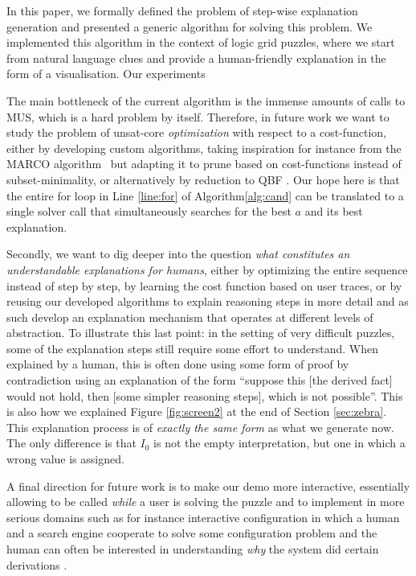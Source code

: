 In this paper, we formally defined the problem of step-wise explanation generation and presented a generic algorithm for solving this problem. 
We implemented this algorithm in the context of logic grid puzzles, where we start from natural language clues and provide a human-friendly explanation in the form of a visualisation.
Our experiments 


The main bottleneck of the current algorithm is the immense amounts of calls to MUS, which is a hard problem by itself. 
Therefore, in future work we want to study the problem of unsat-core \emph{optimization} with respect to a cost-function, either by  developing custom algorithms, taking inspiration for instance from the MARCO algorithm~\cite{liffiton2013enumerating} but adapting it to prune based on cost-functions instead of subset-minimality, or alternatively by reduction to QBF \cite{QBF}.
Our hope here is that the entire for loop in Line \ref{line:for} of Algorithm\ref{alg:cand} can be translated to a single solver call that simultaneously searches for the best $a$ and its best explanation. 

Secondly, we want to dig deeper into the question \emph{what constitutes an understandable explanations for humans}, either by optimizing the entire sequence instead of step by step, by learning the cost function based on user traces, or by reusing our developed algorithms to explain reasoning steps in more detail and as such develop an explanation mechanism that operates at different levels of abstraction. 
To illustrate this last point: in the setting of very difficult puzzles, some of the explanation steps still require some effort to understand. 
When explained by a human, this is often done using some form of proof by contradiction using an explanation of the form ``suppose this [the derived fact] would not hold, then [some simpler reasoning steps], which is not possible''. This is also how we explained Figure \ref{fig:screen2} at the end of Section \ref{sec:zebra}.
This explanation process is of \emph{exactly the same form} as what we generate now. The only difference is that $I_0$ is not the empty interpretation, but one in which a wrong value is assigned. 

A final direction for future work is to make our demo more interactive, essentially allowing \ourtool to be called \emph{while} a user is solving the puzzle and to implement in more serious domains such as for instance interactive configuration in which a human and a search engine cooperate to solve some configuration problem and the human can often be interested in understanding \emph{why} the system did certain derivations \cite{DBLP:journals/tplp/HertumDJD17,DBLP:conf/bnaic/CarbonnelleADVD19}. 


